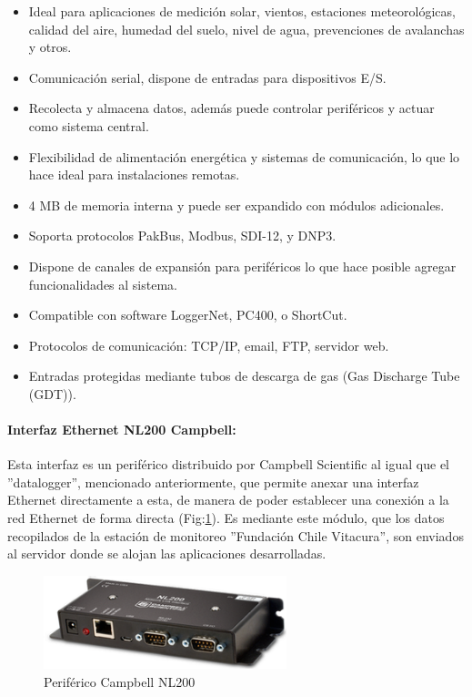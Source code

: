 \begin{itemize}
\item Ideal para aplicaciones de medición solar, vientos, estaciones meteorológicas, calidad del aire, humedad del suelo, nivel de agua, prevenciones de avalanchas y otros.
\item Comunicación serial, dispone de entradas para dispositivos E/S.
\item Recolecta y almacena datos, además puede controlar periféricos y actuar como sistema central.
\item Flexibilidad de alimentación energética y sistemas de comunicación, lo que lo hace ideal para instalaciones remotas.
\item 4 MB de memoria interna y puede ser expandido con módulos adicionales.
\item Soporta protocolos PakBus, Modbus, SDI-12, y DNP3.
\item Dispone de canales de expansión para periféricos lo que hace posible agregar funcionalidades al sistema.
\item Compatible con software LoggerNet, PC400, o ShortCut.
\item Protocolos de comunicación: TCP/IP, email, FTP, servidor web.
\item Entradas protegidas mediante tubos de descarga de gas (Gas Discharge Tube (GDT)).
\end{itemize}

\paragraph{Interfaz Ethernet NL200 Campbell:}
Esta interfaz es un periférico distribuido por Campbell Scientific al igual que el ''datalogger'', mencionado anteriormente, que permite anexar una interfaz Ethernet directamente a esta, de manera de poder establecer una conexión a la red Ethernet de forma directa (Fig:\ref{nl200}). Es mediante este módulo, que los datos recopilados de la estación de monitoreo ''Fundación Chile Vitacura'', son enviados al servidor donde se alojan las aplicaciones desarrolladas.\\

\begin{figure}[h!]
        \centering
        \includegraphics[width=200pt]{images/nl200}
        \caption{Periférico Campbell NL200}
	\label{nl200} 
\end{figure}

